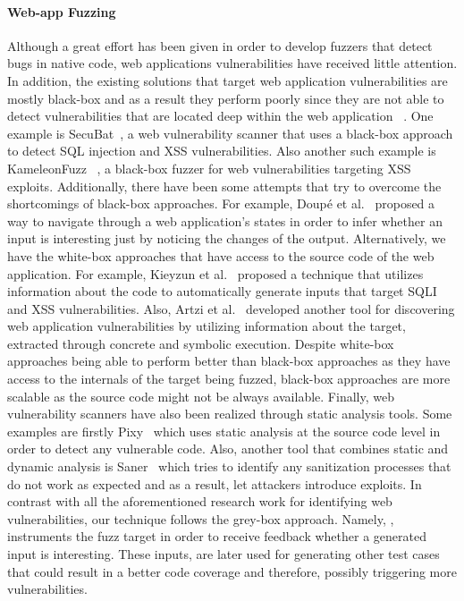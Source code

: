 \paragraph{Web-app Fuzzing}
Although a great effort has been given in order to develop fuzzers that detect bugs in native 
code,  web applications vulnerabilities have received 
little attention. In addition, the existing solutions that target web application vulnerabilities are mostly black-box and as a result 
they perform poorly since they are not able to detect vulnerabilities that are located deep within the web application 
~\cite{doupe2010johnny,bau2010state}. One example is SecuBat~\cite{kals2006secubat}, a web vulnerability scanner that
uses a black-box approach to detect SQL injection and XSS vulnerabilities. Also another such example is KameleonFuzz~
\cite{duchene2014kameleonfuzz}, a black-box fuzzer for web vulnerabilities targeting
XSS exploits. Additionally,  there have been some attempts that try to overcome the shortcomings of black-box approaches. 
For example, Doup{\'e} et al.~\cite{doupe2012enemy} proposed a way to navigate through a web application's states in order to infer whether an 
input is interesting just by noticing the changes of the output. Alternatively, we have the white-box approaches that have access to the 
source code of the web application. For example, Kieyzun et al.~\cite{kieyzun2009automatic} proposed a technique that utilizes
information about the code to automatically generate inputs that target SQLI and XSS vulnerabilities. Also,
Artzi et al.~\cite{artzi2010finding} developed another tool for discovering web application vulnerabilities by utilizing 
information about the target, extracted through concrete and symbolic execution.
Despite white-box approaches being able to perform better than black-box approaches as they have access to the internals of the target being
fuzzed, black-box approaches are more scalable as the source code might not be always available.
Finally, web vulnerability scanners have also been realized through static analysis tools. Some examples are firstly  
Pixy~\cite{jovanovic2010static} which uses static analysis at the source code level in order to detect any vulnerable code. Also, another tool 
that combines static and dynamic analysis is Saner~\cite{balzarotti2008saner} which tries to identify any sanitization processes that do not
work as expected and as a result, let attackers introduce exploits. In contrast with all the aforementioned research
work for identifying web vulnerabilities, our technique follows the grey-box approach. Namely, \pname{}, instruments
the fuzz target in order to receive feedback whether a generated input is interesting. These inputs, are later used for generating
other test cases that could result in a better code coverage and therefore, possibly triggering more vulnerabilities.




